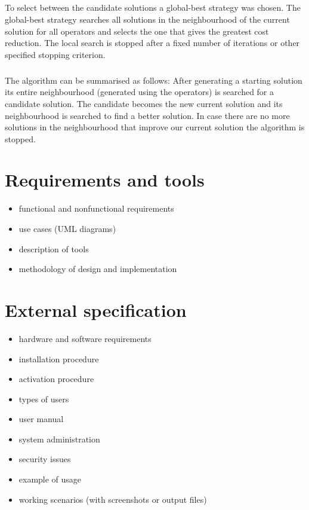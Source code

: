 \documentclass[a4paper,twoside,12pt]{book}
\begin{document}
\paragraph{}
To select between the candidate solutions a global-best strategy was chosen. The global-best strategy searches all solutions in the neighbourhood of the current solution for all operators and selects the one that gives the greatest cost reduction. The local search is stopped after a fixed number of iterations or other specified stopping criterion.
\cite{bib:article:LocalSearchLambda} 
\paragraph{}
The algorithm can be summarised as follows: After generating a starting solution its entire neighbourhood (generated using the operators) is searched for a candidate solution. The candidate becomes the new current solution and its neighbourhood is searched to find a better solution. In case there are no more solutions in the neighbourhood that improve our current solution the algorithm is stopped.
\chapter{Requirements and tools}

\begin{itemize}
\item functional and nonfunctional requirements
\item use cases (UML diagrams)
\item description of tools
\item methodology of design and implementation
\end{itemize} 


\chapter{External specification}
\begin{itemize}
\item hardware and software requirements
\item installation procedure
\item activation procedure
\item types of users
\item user manual
\item system administration
\item security issues
\item example of usage
\item working scenarios (with screenshots or output files)
\end{itemize}
\end{document}
